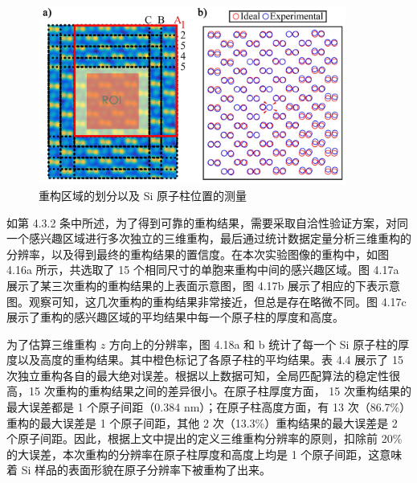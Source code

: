 \begin{figure}[H]
	\vspace{\baselineskip}
	\centering
	\includegraphics[width=0.9\textwidth]{../2.15/215}
	\caption{重构区域的划分以及 Si 原子柱位置的测量}\label{fig:215}
	\song{}
\end{figure}

如第 4.3.2 条中所述，为了得到可靠的重构结果，需要采取自洽性验证方案，对同一个感兴趣区域进行多次独立的三维重构，最后通过统计数据定量分析三维重构的分辨率，以及得到最终的重构结果的置信度。在本次实验图像的重构中，如图 4.16a 所示，共选取了 15 个相同尺寸的单胞来重构中间的感兴趣区域。图 4.17a 展示了某三次重构的重构结果的上表面示意图，图 4.17b 展示了相应的下表示意图。观察可知，这几次重构的重构结果非常接近，但总是存在略微不同。图 4.17c 展示了重构的感兴趣区域的平均结果中每一个原子柱的厚度和高度。

为了估算三维重构 $z$ 方向上的分辨率，图 4.18a 和 b 统计了每一个 Si 原子柱的厚度以及高度的重构结果。其中橙色标记了各原子柱的平均结果。表 4.4 展示了 15 次独立重构各自的最大绝对误差。根据以上数据可知，全局匹配算法的稳定性很高，15 次重构的重构结果之间的差异很小。在原子柱厚度方面， 15 次重构结果的最大误差都是 1 个原子间距（0.384 nm）；在原子柱高度方面，有 13 次（86.7\%）重构的最大误差是 1 个原子间距，其他 2 次（13.3\%）重构结果的最大误差是 2 个原子间距。因此，根据上文中提出的定义三维重构分辨率的原则，扣除前 20\% 的大误差，本次重构的分辨率在原子柱厚度和高度上均是 1 个原子间距，这意味着 Si 样品的表面形貌在原子分辨率下被重构了出来。

\quad

